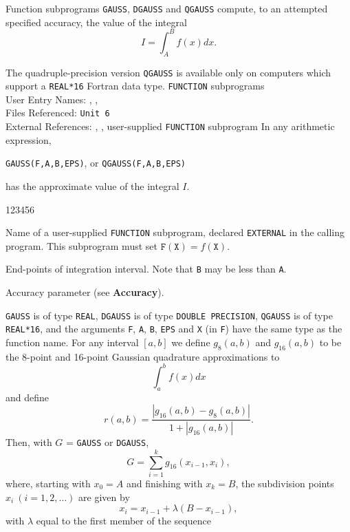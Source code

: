                     
             
\Submitter{}                       
                  
Function subprograms {\tt GAUSS}, {\tt DGAUSS} and {\tt QGAUSS} compute,
to an attempted specified accuracy, the value of the integral
 $$ I=\int^B_A f(x)dx.$$
\par
The quadruple-precision version {\tt QGAUSS} is available only on
computers which support a {\tt REAL*16} Fortran data type.
\Structure
{\tt FUNCTION} subprograms  \\
User Entry Names: , , \\
Files Referenced: {\tt Unit 6} \\
External References: ,  ,
user-supplied {\tt FUNCTION} subprogram
\Usage
In any arithmetic expression,
\begin{center}
{\tt GAUSS(F,A,B,EPS)},  \quad or \quad
{\tt QGAUSS(F,A,B,EPS)}
\end{center}
has the approximate value of the integral $I$.
\begin{DLtt}{123456}
\item[F] Name of a user-supplied {\tt FUNCTION} subprogram, declared
{\tt EXTERNAL} in the calling program. This subprogram must set
$\mathtt{F(X)} = f(\mathtt{X})$.
\item [A,B]End-points of integration interval. Note that {\tt B}
may be less than {\tt A}.
\item[EPS]Accuracy parameter (see {\bf Accuracy}).
\end{DLtt}
{\tt GAUSS} is of type {\tt REAL}, {\tt DGAUSS} is of type
{\tt DOUBLE PRECISION}, {\tt QGAUSS} is of type {\tt REAL*16},
and the arguments {\tt F}, {\tt A}, {\tt B},
{\tt EPS} and {\tt X} (in {\tt F}) have the same type as the function
name.
\Method
For any interval $[a,b]$ we define $g_8(a,b)$ and $g_{16}(a,b)$ to be the
8-point and 16-point Gaussian quadrature approximations to
     $$\int^b_a f(x)dx $$
and define
$$ r(a,b) =\frac{|g_{16} (a,b) - g_8(a,b)|}{1+|g_{16}(a,b)|}. $$
Then, with $G$ = {\tt GAUSS} or {\tt DGAUSS},
$$ G =\sum_{i=1}^kg_{16}(x_{i-1},x_i),$$
\newpage
where, starting with $ x_0=A $ and finishing with $x_k=B$,
the subdivision points $ x_i \ (i=1,2,\ldots) $ are given by
$$ x_i = x_{i-1} + \lambda (B-x_{i-1}), $$
with $\lambda$ equal to the first member of the sequence
